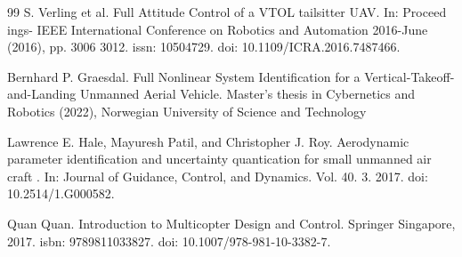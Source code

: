 \documentclass[letterpaper, 10 pt, conference]{ieeeconf}
\begin{document}
\begin{thebibliography}{99}
 S. Verling et al. Full Attitude Control of a VTOL tailsitter UAV. In: Proceed ings- IEEE International Conference on Robotics and Automation 2016-June (2016), pp. 3006 3012. issn: 10504729. doi: 10.1109/ICRA.2016.7487466.

 Bernhard P. Graesdal. Full Nonlinear System Identification for a Vertical-Takeoff-and-Landing Unmanned Aerial Vehicle.  Master’s thesis in Cybernetics and Robotics (2022), Norwegian University of Science and Technology

 Lawrence E. Hale, Mayuresh Patil, and Christopher J. Roy. Aerodynamic parameter identification and uncertainty quantication for small unmanned air craft . In: Journal of Guidance, Control, and Dynamics. Vol. 40. 3. 2017. doi: 10.2514/1.G000582.

 Quan Quan. Introduction to Multicopter Design and Control. Springer Singapore, 2017. isbn: 9789811033827. doi: 10.1007/978-981-10-3382-7.

\end{thebibliography}
\end{document}
